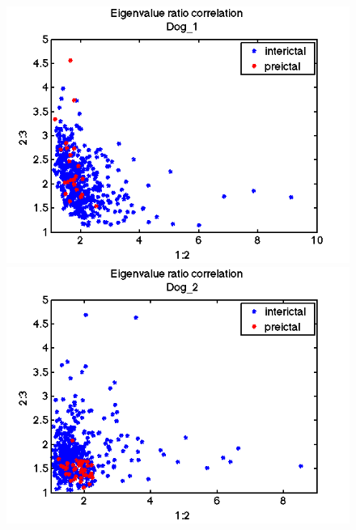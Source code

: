\documentclass[11pt]{article}
\begin{document}
% 
\newcommand{\plotWidth}{.19}
\begin{figure}[H]
\centering
\includegraphics[width=\plotWidth\textwidth]{pictures/evalRatioScatter_dog1.png}
\includegraphics[width=\plotWidth\textwidth]{pictures/evalRatioScatter_dog2.png}

\end{figure}
\end{document}
